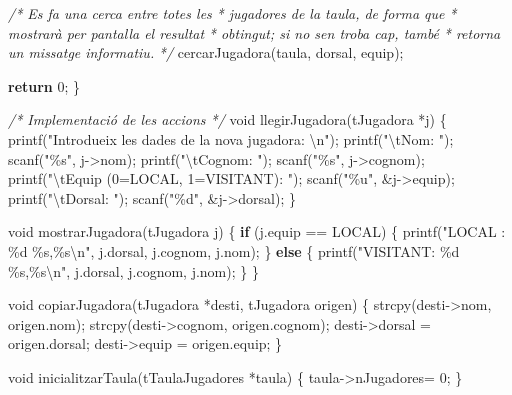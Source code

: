 \documentclass[]{book}
\newenvironment{Shaded}{\begin{snugshade}}{\end{snugshade}}
\newcommand{\CommentTok}[1]{\textcolor[rgb]{0.56,0.35,0.01}{\textit{#1}}}
\newcommand{\ControlFlowTok}[1]{\textcolor[rgb]{0.13,0.29,0.53}{\textbf{#1}}}
\newcommand{\DataTypeTok}[1]{\textcolor[rgb]{0.13,0.29,0.53}{#1}}
\newcommand{\DecValTok}[1]{\textcolor[rgb]{0.00,0.00,0.81}{#1}}
\newcommand{\NormalTok}[1]{#1}
\newcommand{\SpecialCharTok}[1]{\textcolor[rgb]{0.00,0.00,0.00}{#1}}
\newcommand{\StringTok}[1]{\textcolor[rgb]{0.31,0.60,0.02}{#1}}
\begin{document}
\begin{Shaded}
\begin{Highlighting}[]
    \CommentTok{/* Es fa una cerca entre totes les}
\CommentTok{     * jugadores de la taula, de forma que}
\CommentTok{     * mostrarà per pantalla el resultat}
\CommentTok{     * obtingut; si no se\textquotesingle{}n troba cap, també}
\CommentTok{     * retorna un missatge informatiu.}
\CommentTok{     */}
\NormalTok{    cercarJugadora(taula, dorsal, equip);}
     
    \ControlFlowTok{return} \DecValTok{0}\NormalTok{;}
\NormalTok{\}}

\CommentTok{/* Implementació de les accions */}
\DataTypeTok{void}\NormalTok{ llegirJugadora(tJugadora *j) \{}
\NormalTok{    printf(}\StringTok{"Introdueix les dades de la nova jugadora: }\SpecialCharTok{\textbackslash{}n}\StringTok{"}\NormalTok{);}
\NormalTok{    printf(}\StringTok{"}\SpecialCharTok{\textbackslash{}t}\StringTok{Nom: "}\NormalTok{);}
\NormalTok{    scanf(}\StringTok{"\%s"}\NormalTok{, j{-}\textgreater{}nom);}
\NormalTok{    printf(}\StringTok{"}\SpecialCharTok{\textbackslash{}t}\StringTok{Cognom: "}\NormalTok{);}
\NormalTok{    scanf(}\StringTok{"\%s"}\NormalTok{, j{-}\textgreater{}cognom);}
\NormalTok{    printf(}\StringTok{"}\SpecialCharTok{\textbackslash{}t}\StringTok{Equip (0=LOCAL, 1=VISITANT): "}\NormalTok{);}
\NormalTok{    scanf(}\StringTok{"\%u"}\NormalTok{, \&j{-}\textgreater{}equip);}
\NormalTok{    printf(}\StringTok{"}\SpecialCharTok{\textbackslash{}t}\StringTok{Dorsal: "}\NormalTok{);}
\NormalTok{    scanf(}\StringTok{"\%d"}\NormalTok{, \&j{-}\textgreater{}dorsal);}
\NormalTok{\}}

\DataTypeTok{void}\NormalTok{ mostrarJugadora(tJugadora j) \{}
    \ControlFlowTok{if}\NormalTok{ (j.equip == LOCAL) \{}
\NormalTok{        printf(}\StringTok{"LOCAL   : \%d \%s,\%s}\SpecialCharTok{\textbackslash{}n}\StringTok{"}\NormalTok{, j.dorsal, j.cognom, j.nom);}
\NormalTok{    \} }\ControlFlowTok{else}\NormalTok{ \{}
\NormalTok{        printf(}\StringTok{"VISITANT: \%d \%s,\%s}\SpecialCharTok{\textbackslash{}n}\StringTok{"}\NormalTok{, j.dorsal, j.cognom, j.nom);}
\NormalTok{    \}}
\NormalTok{\}}

\DataTypeTok{void}\NormalTok{ copiarJugadora(tJugadora *desti, tJugadora origen) \{}
\NormalTok{    strcpy(desti{-}\textgreater{}nom, origen.nom);}
\NormalTok{    strcpy(desti{-}\textgreater{}cognom, origen.cognom);}
\NormalTok{    desti{-}\textgreater{}dorsal = origen.dorsal;}
\NormalTok{    desti{-}\textgreater{}equip = origen.equip;}
\NormalTok{\}}

\DataTypeTok{void}\NormalTok{ inicialitzarTaula(tTaulaJugadores *taula) \{    }
\NormalTok{    taula{-}\textgreater{}nJugadores= }\DecValTok{0}\NormalTok{;}
\NormalTok{\}}


\end{Highlighting}
\end{Shaded}
\end{document}
